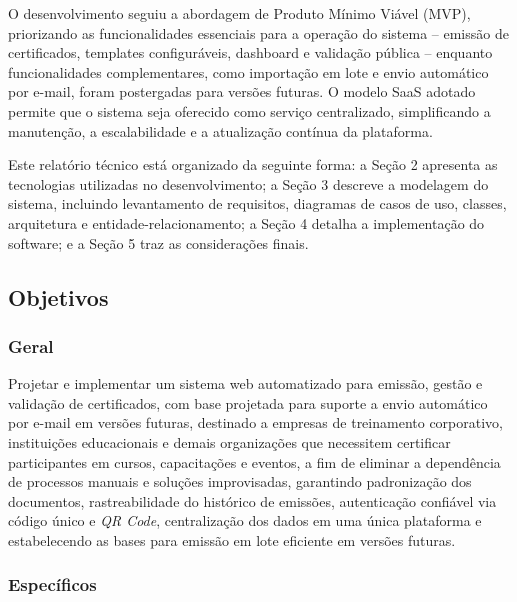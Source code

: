 \documentclass[12pt,openright,oneside,a4paper]{article}
\begin{document}
O desenvolvimento seguiu a abordagem de Produto Mínimo Viável (MVP), priorizando as funcionalidades essenciais para a operação do sistema -- emissão de certificados, templates configuráveis, dashboard e validação pública -- enquanto funcionalidades complementares, como importação em lote e envio automático por e-mail, foram postergadas para versões futuras. O modelo SaaS adotado permite que o sistema seja oferecido como serviço centralizado, simplificando a manutenção, a escalabilidade e a atualização contínua da plataforma.

Este relatório técnico está organizado da seguinte forma: a Seção 2 apresenta as tecnologias utilizadas no desenvolvimento; a Seção 3 descreve a modelagem do sistema, incluindo levantamento de requisitos, diagramas de casos de uso, classes, arquitetura e entidade-relacionamento; a Seção 4 detalha a implementação do software; e a Seção 5 traz as considerações finais.

\subsection{Objetivos}\label{sec:objetivos}

\subsubsection{Geral}\label{sec:objetivo-geral}

Projetar e implementar um sistema web automatizado para emissão, gestão e validação de certificados, com base projetada para suporte a envio automático por e-mail em versões futuras, destinado a empresas de treinamento corporativo, instituições educacionais e demais organizações que necessitem certificar participantes em cursos, capacitações e eventos, a fim de eliminar a dependência de processos manuais e soluções improvisadas, garantindo padronização dos documentos, rastreabilidade do histórico de emissões, autenticação confiável via código único e \textit{QR Code}, centralização dos dados em uma única plataforma e estabelecendo as bases para emissão em lote eficiente em versões futuras.

\subsubsection{Específicos}\label{sec:objetivos-especificos}
\end{document}
